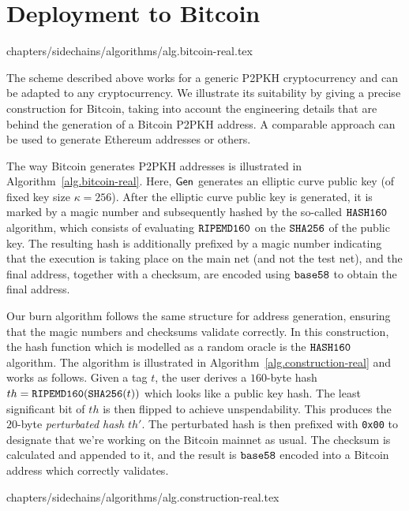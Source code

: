 \section{Deployment to Bitcoin}\label{sec.real}
{chapters/sidechains/algorithms/alg.bitcoin-real.tex}

The scheme described above works for a generic P2PKH cryptocurrency and can be adapted to any cryptocurrency. We illustrate its suitability by giving a precise construction for Bitcoin, taking into account the engineering details that are behind the generation of a Bitcoin P2PKH address. A comparable approach can be used to generate Ethereum addresses or others.

The way Bitcoin generates P2PKH addresses is illustrated in Algorithm~\ref{alg.bitcoin-real}. Here, $\mathsf{Gen}$ generates an elliptic curve public key (of fixed key size $\kappa = 256$). After the elliptic curve public key is generated, it is marked by a magic number and subsequently hashed by the so-called $\texttt{HASH160}$ algorithm, which consists of evaluating $\texttt{RIPEMD160}$ on the $\mathtt{SHA256}$ of the public key. The resulting hash is additionally prefixed by a magic number indicating that the execution is taking place on the main net (and not the test net), and the final address, together with a checksum, are encoded using $\texttt{base58}$ to obtain the final address.

Our burn algorithm follows the same structure for address generation, ensuring that the magic numbers and checksums validate correctly. In this construction, the hash function which is modelled as a random oracle is the $\texttt{HASH160}$ algorithm. The algorithm is illustrated in Algorithm~\ref{alg.construction-real} and works as follows.
Given a tag $t$, the user derives a $160$-byte
hash $th = \texttt{RIPEMD160}(\mathtt{SHA256}(t))$ which looks like a public key hash.
The least significant bit of
$th$ is then flipped to achieve unspendability. This produces the $20$-byte
\emph{perturbated hash} $th'$. The perturbated hash
is then prefixed with \texttt{0x00} to designate that we're working on the Bitcoin mainnet as usual. The checksum is calculated and appended
to it, and the result is
$\texttt{base58}$ encoded into a Bitcoin address which correctly validates.

{chapters/sidechains/algorithms/alg.construction-real.tex}

